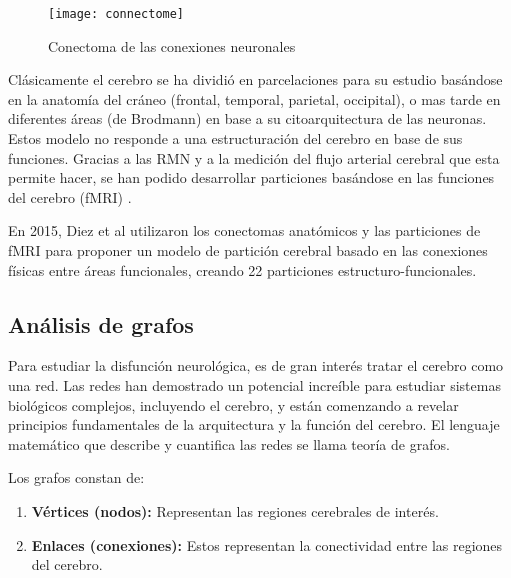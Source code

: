 \documentclass[fleqn,10pt]{UICArticle} %
\begin{document}
\begin{figure}[ht]
	\centering
	\texttt{[image: connectome]}
	\caption{Conectoma de las conexiones neuronales}
	\label{fig:connectome}
\end{figure}



Clásicamente el cerebro se ha dividió en parcelaciones para su estudio basándose en la anatomía del cráneo (frontal, temporal, parietal, occipital), o mas tarde en diferentes áreas (de Brodmann) en base a su citoarquitectura de las neuronas. Estos modelo no responde a una estructuración del cerebro en base de sus funciones. Gracias a las RMN y a la medición del flujo arterial cerebral que esta permite hacer, se han podido desarrollar particiones basándose en las funciones del cerebro (fMRI) \cite{Ogawa1990}.

En 2015, Diez et al \cite{Diez2015} utilizaron los conectomas anatómicos y las particiones de fMRI \cite{Heller2006} para proponer un modelo de partición cerebral basado en las conexiones físicas entre áreas funcionales, creando 22 particiones estructuro-funcionales. 

\subsection{Análisis de grafos}


Para estudiar la disfunción neurológica, es de gran interés tratar el cerebro como una red. Las redes han demostrado un potencial increíble para estudiar sistemas biológicos complejos, incluyendo el cerebro, y están comenzando a revelar principios fundamentales de la arquitectura y la función del cerebro. El lenguaje matemático que describe y cuantifica las redes se llama teoría de grafos.

\vspace{3mm} 
Los grafos constan de:
\begin{enumerate}[noitemsep]
\item \textbf{Vértices (nodos):} Representan las regiones cerebrales de interés.
\item \textbf{Enlaces (conexiones):} Estos representan la conectividad entre las regiones del cerebro.
\end{enumerate}
\end{document}
